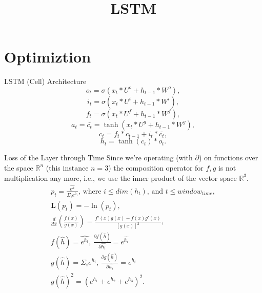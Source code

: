 \documentclass[10pt]{beamer}
\title[RNN]{LSTM}
\newcommand{\dfdh}{\frac{\partial f(\hat{h})}{\partial \hat{h_{i}}}}
\newcommand{\dgdh}{\frac{\partial g(\hat{h})}{\partial \hat{h_{i}}}}
\newcommand{\g}{\Sigma_{i}e^{h_{i}}}
\newcommand{\f}{\hat{e^{h_{t}}}}
\begin{document}
\section{Optimiztion}

\begin{frame}{LSTM (Cell) Architecture}
    \begin{equation}
        o_{t} = \sigma(x_{t}*U^{o} + h_{t-1}*W^{o}), 
    \end{equation}
    \begin{equation}
        i_{t} = \sigma(x_{t}*U^{i} + h_{t-1}*W^{i}),
    \end{equation}
    \begin{equation}
        f_{t} = \sigma(x_{t}*U^{f} + h_{t-1}*W^{f}),
    \end{equation}
    \begin{equation}
        a_{t}  = \bar{c_{t}} = \tanh(x_{t}*U^{g} + h_{t-1}*W^{g}),
    \end{equation}
    \begin{equation}
        c_{t} = f_{t} * c_{t-1} + i_{t} * \bar{c_{t}},  
    \end{equation}
    \begin{equation}
        h_{t} = \tanh(c_{t}) * o_{t}.   
    \end{equation}
\end{frame}

\begin{frame}{Loss of the Layer through Time}
    Since we're operating (with $\partial$) on functions over the space $\mathbb{R}^{n}$ (this instance $n=3$) the composition operator 
    for $f, g$ is not multiplication any more, 
    i.e., we use the inner product of the vector space $\mathbb{R}^{3}$.
    \begin{align}
        p_{t} = \frac{\hat{e^{h}}}{\Sigma_{i}e^{h_{i}}} \text{, where } i\le dim(h_{t}) 
        \text{, and } t \le window_{time},\\
        \mathbf{L}(p_{t}) = -\ln(p_{t}),\\
        \frac{d}{dx}\left(\frac{f(x)}{g(x)}\right) = \frac{f'(x)g(x) - f(x)g'(x)}{[g(x)]^2},\\
        f(\hat{h}) = \f \text{, } \dfdh = e^{\hat{h_{i}}}\\
        g(\hat{h}) = \g \text{, } \dgdh = e^{h_{i}}\\
        g(\hat{h})^{2}   =  (e^{h_{1}}+e^{h_{2}}+e^{h_{3}})^{2}.
    \end{align}

\end{frame}
\end{document}
